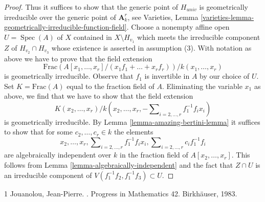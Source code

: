 \documentclass[10pt,a4paper]{amsart}
\theoremstyle{plain}
\theoremstyle{definition}
\theoremstyle{remark}
\numberwithin{equation}{subsection}
\def\Spec{\mathop{\mathrm{Spec}}}
\begin{document}
\begin{proof}
\medskip\noindent
Thus it suffices to show that the generic point of $H_{univ}$
is geometrically irreducible over the generic point of $\mathbf{A}^r_k$, see
Varieties, Lemma
\ref{varieties-lemma-geometrically-irreducible-function-field}.
Choose a nonempty affine open $U = \Spec(A)$ of $X$
contained in $X \setminus H_{v_1}$ which meets the irreducible
component $Z$ of $H_{v_2} \cap H_{v_3}$ whose existence is asserted in
assumption (3). With notation as above we have to prove that
the field extension
$$
\text{Frac}(A[x_1, \ldots, x_r]/(x_1f_1 + \ldots + x_rf_r))/
k(x_1, \ldots , x_r)
$$
is geometrically irreducible. Observe that $f_1$ is invertible in $A$
by our choice of $U$.
Set $K = \text{Frac}(A)$ equal to the fraction field of $A$.
Eliminating the variable $x_1$ as above,
we find that we have to show that the field extension
$$
K(x_2, \ldots, x_r)/
k(x_2, \ldots, x_r, -\sum\nolimits_{i = 2, \ldots, r} f_1^{-1}f_i x_i)
$$
is geometrically irreducible. By Lemma \ref{lemma-amazing-bertini-lemma}
it suffices to show that for some $c_2, \ldots, c_r \in k$ the elements
$$
x_2, \ldots, x_r, \sum\nolimits_{i = 2, \ldots, r} f_1^{-1}f_i x_i,
\sum\nolimits_{i = 2, \ldots, r} c_if_1^{-1}f_i
$$
are algebraically independent over $k$ in the fraction field of
$A[x_2, \ldots, x_r]$. This follows from
Lemma \ref{lemma-algebraically-independent}
and the fact that $Z \cap U$ is an irreducible
component of $V(f_1^{-1}f_2, f_1^{-1}f_3) \subset U$.
\end{proof}

\begin{thebibliography}{1}
Jouanolou, Jean-Pierre.
.
\newblock Progress in Mathematics 42. Birkh\"{a}user, 1983.
\end{thebibliography}
\end{document}
